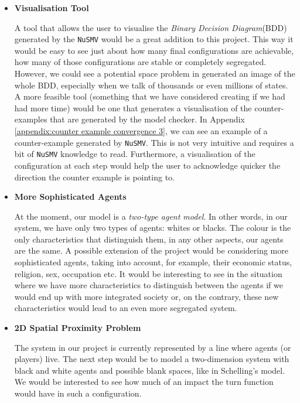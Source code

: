 \documentclass[../main.tex]{subfiles}
\begin{document}
\begin{itemize}
    \item \textbf{Visualisation Tool}
    
    A tool that allows the user to visualise the \textit{Binary Decision Diagram}(BDD) generated by the \verb|NuSMV| would be a great addition to this project. This way it would be easy to see just about how many final configurations are achievable, how many of those configurations are stable or completely segregated. However, we could see a potential space problem in generated an image of the whole BDD, especially when we talk of thousands or even millions of states. A more feasible tool (something that we have considered creating if we had had more time) would be one that generates a visualisation of the counter-examples that are generated by the model checker. In Appendix \ref{appendix:counter example convergence 3}, we can see an example of a counter-example generated by \verb|NuSMV|. This is not very intuitive and requires a bit of \verb|NuSMV| knowledge to read. Furthermore, a visualisation of the configuration at each step would help the user to acknowledge quicker the direction the counter example is pointing to.  \\
    
    \item \textbf{More Sophisticated Agents}
    
    At the moment, our model is a \textit{two-type agent model}. In other words, in our system, we have only two types of agents: whites or blacks. The colour is the only characteristics that distinguish them, in any other aspects, our agents are the same. A possible extension of the project would be considering more sophisticated agents, taking into account, for example, their economic status, religion, sex, occupation etc. It would be interesting to see in the situation where we have more characteristics to distinguish between the agents if we would end up with more integrated society or, on the contrary, these new characteristics would lead to an even more segregated system.\\
    
    \item \textbf{2D Spatial Proximity Problem}
    
    The system in our project is currently represented by a line where agents (or players) live. The next step would be to model a two-dimension system with black and white agents and possible blank spaces, like in Schelling's model. We would be interested to see how much of an impact the turn function would have in such a configuration.\\
    

\end{itemize}
\end{document}
